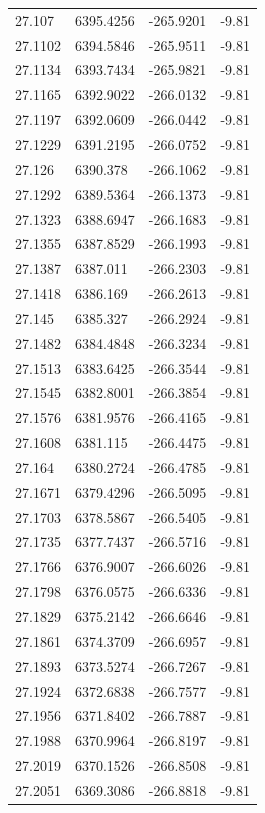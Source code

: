 \begin{table}[H]
\begin{tabular}{llll}
27.107 & 6395.4256 & -265.9201 & -9.81 \\
27.1102 & 6394.5846 & -265.9511 & -9.81 \\
27.1134 & 6393.7434 & -265.9821 & -9.81 \\
27.1165 & 6392.9022 & -266.0132 & -9.81 \\
27.1197 & 6392.0609 & -266.0442 & -9.81 \\
27.1229 & 6391.2195 & -266.0752 & -9.81 \\
27.126 & 6390.378 & -266.1062 & -9.81 \\
27.1292 & 6389.5364 & -266.1373 & -9.81 \\
27.1323 & 6388.6947 & -266.1683 & -9.81 \\
27.1355 & 6387.8529 & -266.1993 & -9.81 \\
27.1387 & 6387.011 & -266.2303 & -9.81 \\
27.1418 & 6386.169 & -266.2613 & -9.81 \\
27.145 & 6385.327 & -266.2924 & -9.81 \\
27.1482 & 6384.4848 & -266.3234 & -9.81 \\
27.1513 & 6383.6425 & -266.3544 & -9.81 \\
27.1545 & 6382.8001 & -266.3854 & -9.81 \\
27.1576 & 6381.9576 & -266.4165 & -9.81 \\
27.1608 & 6381.115 & -266.4475 & -9.81 \\
27.164 & 6380.2724 & -266.4785 & -9.81 \\
27.1671 & 6379.4296 & -266.5095 & -9.81 \\
27.1703 & 6378.5867 & -266.5405 & -9.81 \\
27.1735 & 6377.7437 & -266.5716 & -9.81 \\
27.1766 & 6376.9007 & -266.6026 & -9.81 \\
27.1798 & 6376.0575 & -266.6336 & -9.81 \\
27.1829 & 6375.2142 & -266.6646 & -9.81 \\
27.1861 & 6374.3709 & -266.6957 & -9.81 \\
27.1893 & 6373.5274 & -266.7267 & -9.81 \\
27.1924 & 6372.6838 & -266.7577 & -9.81 \\
27.1956 & 6371.8402 & -266.7887 & -9.81 \\
27.1988 & 6370.9964 & -266.8197 & -9.81 \\
27.2019 & 6370.1526 & -266.8508 & -9.81 \\
27.2051 & 6369.3086 & -266.8818 & -9.81 \\

\end{tabular}
\end{table}
